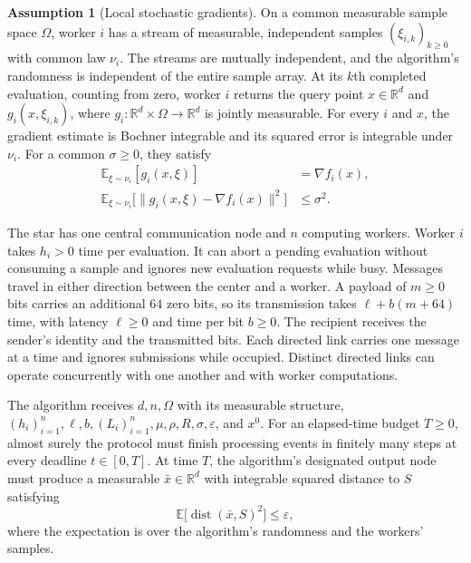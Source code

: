 \documentclass[10pt]{article}
\theoremstyle{definition}
\newtheorem{assumption}{Assumption}
\begin{document}
\begin{assumption}[Local stochastic gradients]
On a common measurable sample space $\Omega$, worker $i$ has a stream of measurable, independent samples $(\xi_{i,k})_{k\geq 0}$ with common law $\nu_i$. The streams are mutually independent, and the algorithm's randomness is independent of the entire sample array. At its $k$th completed evaluation, counting from zero, worker $i$ returns the query point $x\in\mathbb{R}^d$ and $g_i(x,\xi_{i,k})$, where $g_i:\mathbb{R}^d\times\Omega\to\mathbb{R}^d$ is jointly measurable. For every $i$ and $x$, the gradient estimate is Bochner integrable and its squared error is integrable under $\nu_i$. For a common $\sigma\geq 0$, they satisfy
\[
\begin{aligned}
\mathbb{E}_{\xi\sim\nu_i}[g_i(x,\xi)] &= \nabla f_i(x),\\
\mathbb{E}_{\xi\sim\nu_i}\bigl[\|g_i(x,\xi)-\nabla f_i(x)\|^2\bigr] &\leq \sigma^2.
\end{aligned}
\]
\end{assumption}

The star has one central communication node and $n$ computing workers. Worker $i$ takes $h_i>0$ time per evaluation. It can abort a pending evaluation without consuming a sample and ignores new evaluation requests while busy. Messages travel in either direction between the center and a worker. A payload of $m\geq 0$ bits carries an additional $64$ zero bits, so its transmission takes $\ell+b(m+64)$ time, with latency $\ell\geq 0$ and time per bit $b\geq 0$. The recipient receives the sender's identity and the transmitted bits. Each directed link carries one message at a time and ignores submissions while occupied. Distinct directed links can operate concurrently with one another and with worker computations.

The algorithm receives $d,n,\Omega$ with its measurable structure, $(h_i)_{i=1}^n,\ell,b,(L_i)_{i=1}^n,\mu,\rho,R,\sigma,\varepsilon$, and $x^0$. For an elapsed-time budget $T\geq 0$, almost surely the protocol must finish processing events in finitely many steps at every deadline $t\in[0,T]$. At time $T$, the algorithm's designated output node must produce a measurable $\bar{x}\in\mathbb{R}^d$ with integrable squared distance to $S$ satisfying
\[
\mathbb{E}\bigl[\operatorname{dist}(\bar{x},S)^2\bigr]\leq\varepsilon,
\]
where the expectation is over the algorithm's randomness and the workers' samples.
\end{document}
